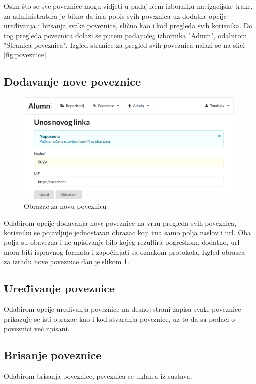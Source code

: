 \documentclass[zavrsni, numeric]{fer}
\begin{document}
Osim što se sve poveznice mogu vidjeti u padajućem izborniku navigacijske trake, za administratora je bitno da ima popis svih poveznica uz dodatne opcije uređivanja i brisanja svake poveznice, slično kao i kod pregleda svih korisnika. Do tog pregleda poveznica dolazi se putem padajućeg izbornika "Admin", odabirom "Stranica poveznica". Izgled stranice za pregled svih poveznica nalazi se na slici \ref{fig:poveznice}.

\subsection{Dodavanje nove poveznice}

\begin{figure}[H]
	\centering
	\includegraphics[width=13cm]{slike/nova-poveznica.png}
	\caption{Obrazac za novu poveznicu}
	\label{fig:nova-poveznica}
\end{figure}

Odabirom opcije dodavanja nove poveznice na vrhu pregleda svih poveznica, korisniku se pojavljuje jednostavan obrazac koji ima samo polja naslov i url. Oba polja su obavezna i ne upisivanje bilo kojeg rezultira pogreškom, dodatno, url mora biti ispravnog formata i započinjati sa oznakom protokola. Izgled obrasca za izradu nove poveznice dan je slikom \ref{fig:nova-poveznica}.

\subsection{Uređivanje poveznice}
Odabirom opcije uređivanja poveznice na desnoj strani zapisa svake poveznice prikazuje se isti obrazac kao i kod stvaranja poveznice, uz to da su podaci o poveznici već upisani. 

\subsection{Brisanje poveznice}
Odabirom brisanja poveznice, poveznica se uklanja iz sustava.
\end{document}
